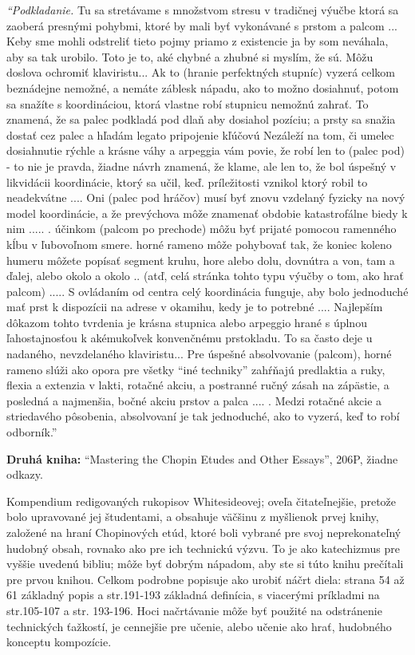 \textit{“Podkladanie.} Tu sa stretávame s množstvom stresu v tradičnej výučbe ktorá sa zaoberá presnými pohybmi, ktoré by mali byť vykonávané s prstom a palcom ... Keby sme mohli odstreliť tieto pojmy priamo z existencie ja by som neváhala, aby sa tak urobilo. Toto je to, aké chybné a zhubné si myslím, že sú. Môžu doslova ochromiť klaviristu... Ak to (hranie perfektných stupníc) vyzerá celkom beznádejne nemožné, a nemáte záblesk nápadu, ako to možno dosiahnuť, potom sa snažíte s koordináciou, ktorá vlastne robí stupnicu nemožnú zahrať. To znamená, že sa palec podkladá pod dlaň aby dosiahol pozíciu; a prsty sa snažia dostať cez palec a hľadám legato pripojenie kľúčovú Nezáleží na tom, či umelec dosiahnutie rýchle a krásne váhy a arpeggia vám povie, že robí len to (palec pod) - to nie je pravda, žiadne návrh znamená, že klame, ale len to, že bol úspešný v likvidácii koordinácie, ktorý sa učil, keď. príležitosti vznikol ktorý robil to neadekvátne .... Oni (palec pod hráčov) musí byť znovu vzdelaný fyzicky na nový model koordinácie, a že prevýchova môže znamenať obdobie katastrofálne biedy k nim ..... . účinkom (palcom po prechode) môžu byť prijaté pomocou ramenného kĺbu v ľubovoľnom smere. horné rameno môže pohybovať tak, že koniec koleno humeru môžete popísať segment kruhu, hore alebo dolu, dovnútra a von, tam a ďalej, alebo okolo a okolo .. (atď, celá stránka tohto typu výučby o tom, ako hrať palcom) ..... S ovládaním od centra celý koordinácia funguje, aby bolo jednoduché mať prst k dispozícii na adrese v okamihu, kedy je to potrebné .... Najlepším dôkazom tohto tvrdenia je krásna stupnica alebo arpeggio hrané s úplnou ľahostajnosťou k akémukoľvek konvenčnému prstokladu. To sa často deje u nadaného, nevzdelaného klaviristu... Pre úspešné absolvovanie (palcom), horné rameno slúži ako opora pre všetky “iné techniky” zahŕňajú predlaktia a ruky, flexia a extenzia v lakti, rotačné akciu, a postranné ručný zásah na zápästie, a posledná a najmenšia, bočné akciu prstov a palca .... . Medzi rotačné akcie a striedavého pôsobenia, absolvovaní je tak jednoduché, ako to vyzerá, keď to robí odborník.” 

\textbf{Druhá kniha:} “Mastering the Chopin Etudes and Other Essays”, 206P, žiadne odkazy. 

Kompendium redigovaných rukopisov Whitesideovej; oveľa čitateľnejšie, pretože bolo upravované jej študentami, a obsahuje väčšinu z myšlienok prvej knihy, založené na hraní Chopinových etúd, ktoré boli vybrané pre svoj neprekonateľný hudobný obsah, rovnako ako pre ich technickú výzvu. To je ako katechizmus pre vyššie uvedenú bibliu; môže byť dobrým nápadom, aby ste si túto knihu prečítali pre prvou knihou. Celkom podrobne popisuje ako urobiť náčrt diela: strana 54 až 61 základný popis a str.191-193 základná definícia, s viacerými príkladmi na str.105-107 a str. 193-196. Hoci načrtávanie môže byť použité na odstránenie technických ťažkostí, je cennejšie pre učenie, alebo učenie ako hrať, hudobného konceptu kompozície. 

